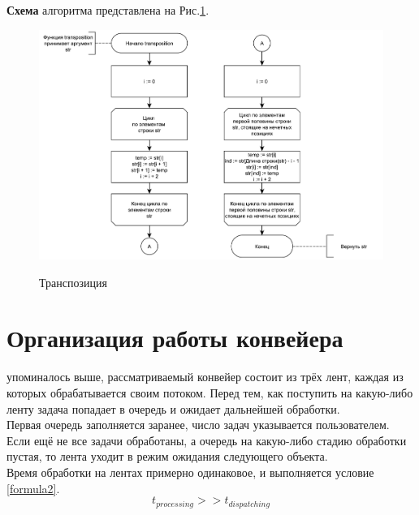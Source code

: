 \textbf{Схема} алгоритма представлена на Рис.\ref{fig3:image}.\\
\begin{figure}[h]
	\begin{center}
		{\includegraphics[scale = 0.65]{schemes/trans}}
		\caption{Транспозиция}
		\label{fig3:image}
	\end{center}
\end{figure}

\newpage

\section{Организация работы конвейера}
 упоминалось выше, рассматриваемый конвейер состоит из трёх лент, каждая из которых обрабатывается своим потоком. Перед тем, как поступить на какую-либо ленту задача попадает в очередь и ожидает дальнейшей обработки. \\

Первая очередь заполняется заранее, число задач указывается пользователем. Если ещё не все задачи обработаны, а очередь на какую-либо стадию обработки пустая, то лента уходит в режим ожидания следующего объекта.\\

Время обработки на лентах примерно одинаковое, и выполняется условие \ref{formula2}.
\begin{equation}\label{formula2}
	t_{processing} >> t_{dispatching}
\end{equation} 

